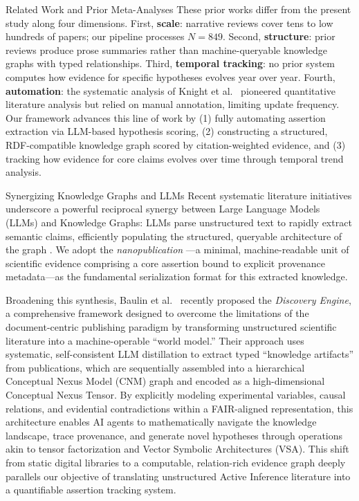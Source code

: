 \documentclass[
  ignorenonframetext,
]{beamer}
\begin{document}
\begin{frame}[fragile]{Related Work and Prior Meta-Analyses}
These prior works differ from the present study along four dimensions.
First, \textbf{scale}: narrative reviews cover tens to low hundreds of
papers; our pipeline processes \(N = 849\). Second, \textbf{structure}:
prior reviews produce prose summaries rather than machine-queryable
knowledge graphs with typed relationships. Third, \textbf{temporal
tracking}: no prior system computes how evidence for specific hypotheses
evolves year over year. Fourth, \textbf{automation}: the systematic
analysis of Knight et al.~\citep{knight2022fep} pioneered quantitative
literature analysis but relied on manual annotation, limiting update
frequency. Our framework advances this line of work by (1) fully
automating assertion extraction via LLM-based hypothesis scoring, (2)
constructing a structured, RDF-compatible knowledge graph scored by
citation-weighted evidence, and (3) tracking how evidence for core
claims evolves over time through temporal trend analysis.
\end{frame}

\begin{frame}{Synergizing Knowledge Graphs and LLMs}
\protect{}\label{synergizing-knowledge-graphs-and-llms}
Recent systematic literature initiatives underscore a powerful
reciprocal synergy between Large Language Models (LLMs) and Knowledge
Graphs: LLMs parse unstructured text to rapidly extract semantic claims,
efficiently populating the structured, queryable architecture of the
graph \citep{quevedo2025combining, li2024unifying}. We adopt the
\emph{nanopublication} \citep{groth2010anatomy}---a minimal,
machine-readable unit of scientific evidence comprising a core assertion
bound to explicit provenance metadata---as the fundamental serialization
format for this extracted knowledge.

Broadening this synthesis, Baulin et al.~\citep{baulin2025discovery}
recently proposed the \emph{Discovery Engine}, a comprehensive framework
designed to overcome the limitations of the document-centric publishing
paradigm by transforming unstructured scientific literature into a
machine-operable ``world model.'' Their approach uses systematic,
self-consistent LLM distillation to extract typed ``knowledge
artifacts'' from publications, which are sequentially assembled into a
hierarchical Conceptual Nexus Model (CNM) graph and encoded as a
high-dimensional Conceptual Nexus Tensor. By explicitly modeling
experimental variables, causal relations, and evidential contradictions
within a FAIR-aligned representation, this architecture enables AI
agents to mathematically navigate the knowledge landscape, trace
provenance, and generate novel hypotheses through operations akin to
tensor factorization and Vector Symbolic Architectures (VSA). This shift
from static digital libraries to a computable, relation-rich evidence
graph deeply parallels our objective of translating unstructured Active
Inference literature into a quantifiable assertion tracking system.
\end{frame}
\end{document}
